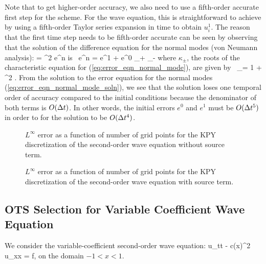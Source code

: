 \documentclass[oneeqnum,onefignum,onetabnum,onethmnum]{siamltex}
\begin{document}
Note that to get higher-order accuracy, we also need to use a fifth-order
accurate first step for the scheme.  For the wave equation, this is 
straightforward to achieve by using a fifth-order Taylor series expansion
in time to obtain $u^1_i$.  The reason that the first time step needs to be 
fifth-order accurate can be seen by observing that the solution of the 
difference equation for the normal modes (von Neumann analysis):
\bea
   = \dt^2 \lambda e^{n}
  \label{eq:error_eqn_normal_mode}
\eea
is~\cite{carrier_pearson_book}
\bea
  e^n = e^1  
      + e^0 \kappa_+ \kappa_- 
  \label{eq:error_eqn_normal_mode_soln}
\eea
where $\kappa_\pm$, the roots of the characteristic equation for 
(\ref{eq:error_eqn_normal_mode}), are given by~\cite{kreiss2002}
\beq
  \kappa_\pm = 1 +  \lambda \dt^2 
             \pm \dt {}.
\eeq
From the solution to the error equation for the normal modes 
(\ref{eq:error_eqn_normal_mode_soln}), we see that the solution loses
one temporal order of accuracy compared to the initial conditions because
the denominator of both terms is $O(\Delta t)$.
In other words, the initial errors $e^0$ and $e^1$ must be $O(\Delta t^5)$ in 
order to for the solution to be $O(\Delta t^4)$.  


\begin{figure}[thb]
\begin{center}
\caption{$L^\infty$ error as a function of number of grid points for the
KPY discretization of the second-order wave equation without source term.
}
\label{fig:wave_eqn_no_src_error}
\end{center}
\end{figure}

\begin{figure}[thb]
\begin{center}
\caption{$L^\infty$ error as a function of number of grid points for the
KPY discretization of the second-order wave equation with source term.
}
\label{fig:wave_eqn_src_error}
\end{center}
\end{figure}



\subsection{OTS Selection for Variable Coefficient Wave Equation}
We consider the variable-coefficient second-order wave equation:
\beq
    u_{tt} - c(x)^2 u_{xx} = f,
    \label{eq:var_coef_wave_eqn}
\eeq
on the domain $-1 < x < 1$.
\end{document}
